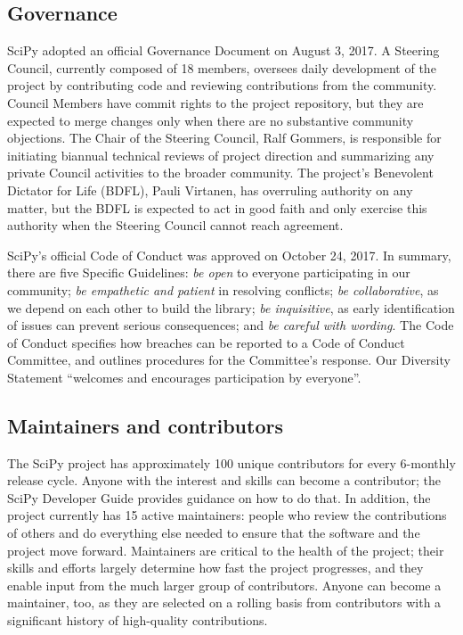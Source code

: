 \documentclass[fleqn,10pt]{wlscirep}
\begin{document}
\subsection*{Governance}

SciPy adopted an official Governance Document on August 3, 2017\cite{SciPyProjectGovernance}. A Steering Council, currently composed of 18 members, oversees daily development of the project by contributing code and reviewing contributions from the community. Council Members have commit rights to the project repository, but they are expected to merge changes only when there are no substantive community objections. The Chair of the Steering Council, Ralf Gommers, is responsible for initiating biannual technical reviews of project direction and summarizing any private Council activities to the broader community. The project's Benevolent Dictator for Life (BDFL), Pauli Virtanen, has overruling authority on any matter, but the BDFL is expected to act in good faith and only exercise this authority when the Steering Council cannot reach agreement.

SciPy's official Code of Conduct was approved on October 24, 2017. In summary, there are five Specific Guidelines:
\emph{be open} to everyone participating in our community;
\emph{be empathetic and patient} in resolving conflicts;
\emph{be collaborative}, as we depend on each other to build the library;
\emph{be inquisitive}, as early identification of issues can prevent serious consequences; and
\emph{be careful with wording}.
The Code of Conduct specifies how breaches can be reported to a Code of Conduct Committee, and outlines procedures for the Committee's response. Our Diversity Statement ``welcomes and encourages participation by everyone''.

\subsection*{Maintainers and contributors}

The SciPy project has approximately 100 unique contributors
for every 6-monthly release cycle. Anyone with the interest and
skills can become a contributor; the SciPy Developer
Guide\cite{scipy-dev-guide} provides guidance on how to do that.
In addition, the project currently has 15 active maintainers: people who review
the contributions of others and do everything else needed to ensure that the
software and the project move forward. Maintainers are critical to the health
of the project\cite{eghbal2016}; their skills and efforts largely determine how
fast the project progresses, and they enable input from the much
larger group of contributors. Anyone can become a maintainer, too, as they
are selected on a rolling basis from contributors with a significant history of
high-quality contributions.
\end{document}
